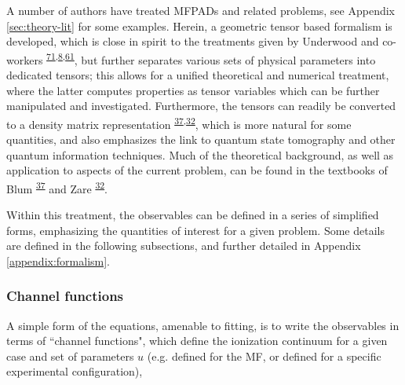 \documentclass[10pt]{article}
\begin{document}
A number of authors have treated MFPADs and related problems, see Appendix \ref{sec:theory-lit} for some examples. Herein, a geometric tensor based formalism is developed, which is close in spirit to the treatments given by Underwood and co-workers \textsuperscript{\hyperref[csl:71]{71},\hyperref[csl:8]{8},\hyperref[csl:61]{61}}, but further separates various sets of physical parameters into dedicated tensors; this allows for a unified theoretical and numerical treatment, where the latter computes properties as tensor variables which can be further manipulated and investigated.%
Furthermore, the tensors can readily be converted to a density matrix representation \textsuperscript{\hyperref[csl:37]{37},\hyperref[csl:32]{32}}, which is more natural for some quantities, and also emphasizes the link to quantum state tomography and other quantum information techniques. Much of the theoretical background, as well as application to aspects of the current problem, can be found in the textbooks of Blum \textsuperscript{\hyperref[csl:37]{37}} and Zare \textsuperscript{\hyperref[csl:32]{32}}.

Within this treatment, the observables can be defined in a series of simplified forms, emphasizing the quantities of interest for a given problem. Some details are defined in the following subsections, and further detailed in Appendix \ref{appendix:formalism}.


\subsubsection{Channel functions\label{sec:channel-funcs}}

A simple form of the equations, amenable to fitting, is to write the observables in terms of ``channel functions", which define the ionization continuum for a given case and set of parameters $u$ (e.g. defined for the MF, or defined for a specific experimental configuration),
\end{document}
